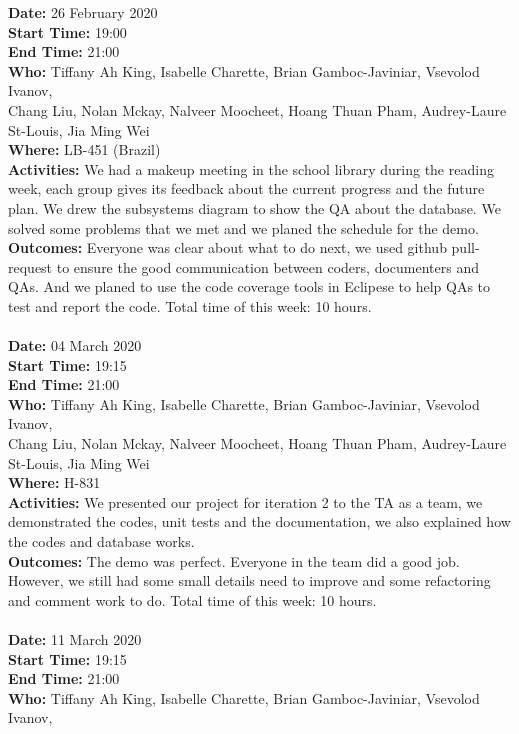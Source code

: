 \documentclass[12pt]{article}
\begin{document}
{\bf Date:} 26 February 2020\\
{\bf Start Time:} 19:00\\
{\bf End Time:} 21:00\\
{\bf Who:} Tiffany Ah King, Isabelle Charette, Brian Gamboc-Javiniar, Vsevolod Ivanov,\\
Chang Liu, Nolan Mckay, Nalveer Moocheet, Hoang Thuan Pham, Audrey-Laure St-Louis, Jia Ming Wei\\
{\bf Where:} LB-451 (Brazil)\\
{\bf Activities:} We had a makeup meeting in the school library during the reading week, each group gives its feedback about the current progress and the future plan. We drew the subsystems diagram to show the QA about the database. We solved some problems that we met and we planed the schedule for the demo.\\
{\bf Outcomes:} Everyone was clear about what to do next, we used github pull-request to ensure the good communication between coders, documenters and QAs. And we planed to use the code coverage tools in Eclipese to help QAs to test and report the code. Total time of this week: 10 hours.\\\\
{\bf Date:} 04 March 2020\\
{\bf Start Time:} 19:15\\
{\bf End Time:} 21:00\\
{\bf Who:} Tiffany Ah King, Isabelle Charette, Brian Gamboc-Javiniar, Vsevolod Ivanov,\\
Chang Liu, Nolan Mckay, Nalveer Moocheet, Hoang Thuan Pham, Audrey-Laure St-Louis, Jia Ming Wei\\
{\bf Where:} H-831\\
{\bf Activities:} We presented our project for iteration 2 to the TA as a team, we demonstrated the codes, unit tests and the documentation, we also explained how the codes and database works.\\
{\bf Outcomes:} The demo was perfect. Everyone in the team did a good job. However, we still had some small details need to improve and some refactoring and comment work to do. Total time of this week: 10 hours.\\\\
{\bf Date:} 11 March 2020\\
{\bf Start Time:} 19:15 \\
{\bf End Time:} 21:00\\
{\bf Who:} Tiffany Ah King, Isabelle Charette, Brian Gamboc-Javiniar, Vsevolod Ivanov,\\
\end{document}
